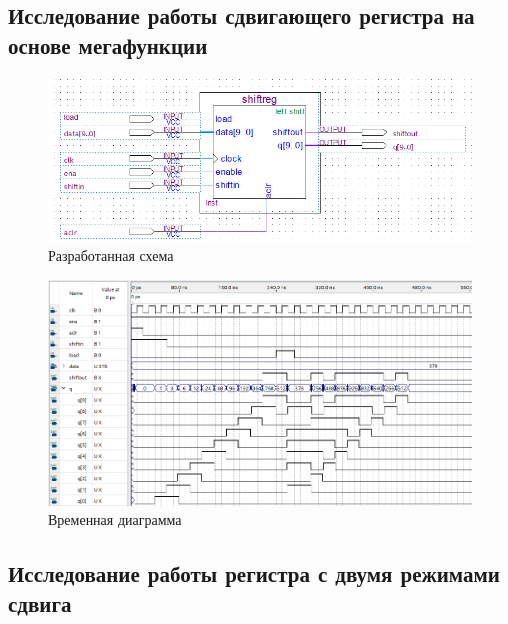 \documentclass[a4paper,12pt]{article}
\begin{document}
    \subsection{Исследование работы сдвигающего регистра на основе мегафункции}

    \begin{figure}[H]
        \centering
        \includegraphics[width=\linewidth]{scheme1}
        \caption{Разработанная схема}
    \end{figure}
    \begin{figure}[H]
        \centering
        \includegraphics[width=\linewidth]{wave1}
        \caption{Временная диаграмма}
    \end{figure}
    
    \subsection{Исследование работы регистра с двумя режимами сдвига}
    
\end{document}

